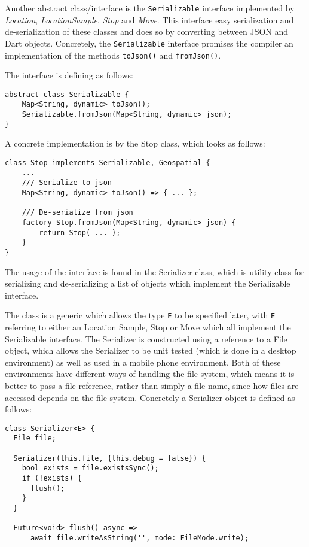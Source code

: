 Another abstract class/interface is the \verb|Serializable| interface implemented by \textit{Location}, \textit{LocationSample}, \textit{Stop} and \textit{Move}. This interface easy serialization and de-serialization of these classes and does so by converting between JSON and Dart objects. Concretely, the \verb|Serializable| interface promises the compiler an implementation of the methods \verb|toJson()| and \verb|fromJson()|.

The interface is defining as follows:
\begin{verbatim}
abstract class Serializable {
    Map<String, dynamic> toJson();
    Serializable.fromJson(Map<String, dynamic> json);
}
\end{verbatim}

A concrete implementation is by the Stop class, which looks as follows:

\begin{verbatim}
class Stop implements Serializable, Geospatial { 
    ...
    /// Serialize to json
    Map<String, dynamic> toJson() => { ... };

    /// De-serialize from json
    factory Stop.fromJson(Map<String, dynamic> json) {
        return Stop( ... );
    }
}
\end{verbatim}

The usage of the interface is found in the Serializer class, which is utility class for serializing and de-serializing a list of objects which implement the Serializable interface.

The class is a generic which allows the type \verb|E| to be specified later, with \verb|E| referring to either an Location Sample, Stop or Move which all implement the Serializable interface. The Serializer is constructed using a reference to a File object, which allows the Serializer to be unit tested (which is done in a desktop environment) as well as used in a mobile phone environment. Both of these environments have different ways of handling the file system, which means it is better to pass a file reference, rather than simply a file name, since how files are accessed depends on the file system. Concretely a Serializer object is defined as follows:
\begin{verbatim}
class Serializer<E> {
  File file;
  
  Serializer(this.file, {this.debug = false}) {
    bool exists = file.existsSync();
    if (!exists) {
      flush();
    }
  }
  
  Future<void> flush() async =>
      await file.writeAsString('', mode: FileMode.write);
\end{verbatim}


